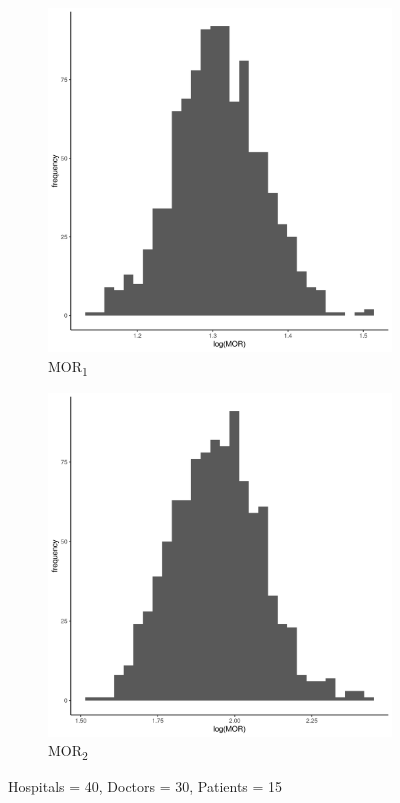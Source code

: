 \documentclass[
  letterpaper,
  DIV=11,
  numbers=noendperiod,
  titlepage]{scrartcl}
\begin{document}
\vspace{10mm}

\begin{figure}
\centering
\begin{subfigure}{.49\textwidth}
    \centering
    \includegraphics[width=.95\linewidth]{../../plots/three-lvl-ran-int/low-prev/hist_40_30_15_three_lvl_low_prev_mor1.png}  
    \caption{MOR\textsubscript{1}}
    \label{l40m30n151}
\end{subfigure}
\begin{subfigure}{.49\textwidth}
    \centering
    \includegraphics[width=.95\linewidth]{../../plots/three-lvl-ran-int/low-prev/hist_40_30_15_three_lvl_low_prev_mor2.png}
    \caption{MOR\textsubscript{2}}
    \label{l40m30n152}
\end{subfigure}
\caption{Hospitals = 40, Doctors = 30, Patients = 15}
\label{mor2}
\end{figure}
\end{document}
